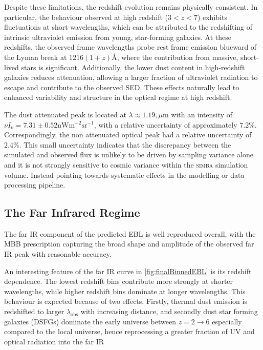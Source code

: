 \documentclass[
    a4paper, %
    10pt, %
    unnumberedsections, %
]{LTJournalArticle}
\begin{document}
Despite these limitations, the redshift evolution remains physically consistent. In particular, the behaviour observed at high redshift ($3 < z < 7$) exhibits fluctuations at short wavelengths, which can be attributed to the redshifting of intrinsic ultraviolet emission from young, star-forming galaxies. At these redshifts, the observed frame wavelengths probe rest frame emission blueward of the Lyman break at $1216(1+z) \text{Å}$, where the contribution from massive, short-lived stars is significant. Additionally, the lower dust content in high-redshift galaxies reduces attenuation, allowing a larger fraction of ultraviolet radiation to escape and contribute to the observed SED. These effects naturally lead to enhanced variability and structure in the optical regime at high redshift.

 
The dust attenuated peak is located at $\lambda \approx 1.19,\mu\mathrm{m}$ with an intensity of $\nu I_\nu = 7.31 \pm 0.52\mathrm{nWm^{-2}sr^{-1}}$, with a relative uncertainty of approximately $7.2\%$. Correspondingly, the non attenuated optical peak had a relative uncertainty of $2.4\%$. This small uncertainty indicates that the discrepancy between the simulated and observed flux is unlikely to be driven by sampling variance alone and it is not strongly sensitive to cosmic variance within the \textsc{simba} simulation volume. Instead pointing towards systematic effects in the modelling or data processing pipeline. 

\subsection{The Far Infrared Regime}

The far IR component of the predicted EBL is well reproduced overall, with the MBB prescription capturing the broad shape and amplitude of the observed far IR peak with reasonable accuracy.

An interesting feature of the far IR curve in \cref{fig:finalBinnedEBL} is its redshift dependence. The lowest redshift bins contribute more strongly at shorter wavelengths, while higher redshift bins dominate at longer wavelengths. This behaviour is expected because of two effects. Firstly, thermal dust emission is redshifted to larger $\lambda_\mathrm{obs}$ with increasing distance, and secondly dust star forming galaxies (DSFGs) dominate the early universe between $z=2\rightarrow6$ especially compared to the local universe, hence reprocessing a greater fraction of UV and optical radiation into the far IR \parencite{reuterCompleteRedshiftDistribution2020}
\end{document}
